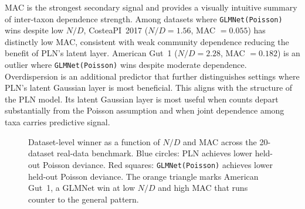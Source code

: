\documentclass[Review,doublespace,sageh,times]{sagej}
\begin{document}
MAC is the strongest secondary signal and provides a visually intuitive summary of inter-taxon dependence strength.
Among datasets where \texttt{GLMNet(Poisson)} wins despite low $N/D$, CosteaPI~2017 ($N/D = 1.56$, MAC $= 0.055$) has distinctly low MAC, consistent with weak community dependence reducing the benefit of PLN's latent layer.
American Gut~1 ($N/D = 2.28$, MAC $= 0.182$) is an outlier where \texttt{GLMNet(Poisson)} wins despite moderate dependence.
Overdispersion is an additional predictor that further distinguishes settings where PLN's latent Gaussian layer is most beneficial.
This aligns with the structure of the PLN model.
Its latent Gaussian layer is most useful when counts depart substantially from the Poisson assumption and when joint dependence among taxa carries predictive signal.

\begin{figure}[!t]
\centering
{}
\caption{Dataset-level winner as a function of $N/D$ and MAC across the 20-dataset real-data benchmark.
Blue circles: PLN achieves lower held-out Poisson deviance.
Red squares: \texttt{GLMNet(Poisson)} achieves lower held-out Poisson deviance.
The orange triangle marks American Gut~1, a GLMNet win at low $N/D$ and high MAC that runs counter to the general pattern.}
\label{fig:nd_mac_scatter}
\end{figure}
\end{document}
